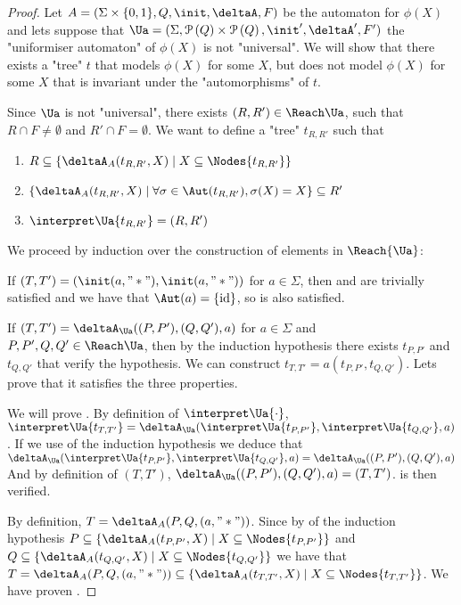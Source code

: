\documentclass[a4paper,UKenglish,cleveref, autoref, thm-restate]{lipics-v2021}
\begin{document}
\begin{proof}
	Let $A =  (\Sigma \times \{0,1\}, Q, \init, \deltaA, F)$ be the automaton for $\phi(X)$ and lets suppose that
	$\Ua = (\Sigma, \parts Q \times \parts Q,\init', \deltaA', F')$ the "uniformiser automaton" of $\phi(X)$ is not "universal".
	We will show that there exists a "tree" $t$ that models  $\phi(X)$ for some $X$, but does not model $\phi(X)$ for
	some $X$ that is invariant under the "automorphisms" of $t$.

	Since $\Ua$ is not "universal", there exists $(R,R') \in \Reach \Ua$, such that $R \cap F \neq \emptyset$ and $R' \cap F = \emptyset$.
	We want to define a "tree" $t_{R,R'}$ such that
	\begin{enumerate}
		\item $R \subseteq \{ \deltaA_A (t_{R,R'},X) \mid X \subseteq \Nodes {t_{R,R'}}\}$ \label{lem:prop1}
		\item $\{ \deltaA_A (t_{R,R'},X) \mid \forall \sigma \in \Aut(t_{R,R'}), \sigma(X) = X\} \subseteq R'$\label{lem:prop2}
		\item $\interpret \Ua {t_{R,R'}} = (R,R')$\label{lem:prop3}
	\end{enumerate}

	We proceed by induction over the construction of elements in $\Reach {\Ua}$:

	If $(T,T') = (\init(a,"*"), \init (a, "*"))$ for $a \in \Sigma$, then  and  are trivially satisfied and we have that
	$\Aut (a) = \{\text{id}\}$, so  is also satisfied.

	If $(T,T') = \deltaA_{\Ua}((P,P'),(Q,Q'),a)$ for $a \in \Sigma$ and $P,P',Q,Q' \in \Reach \Ua$, then by the induction hypothesis there exists
	$t_{P,P'}$ and $t_{Q,Q'}$ that verify the hypothesis. We can construct $t_{T,T'} = a(t_{P,P'},t_{Q,Q'})$. Lets prove that it satisfies the
	three properties.

	We will prove .
	By definition of $\interpret \Ua {\cdot}$,
	$\interpret \Ua {t_{T,T'}} = \deltaA_{\Ua} (\interpret \Ua {t_{P,P'}}, \interpret \Ua {t_{Q,Q'}}, a)$.
	If we use  of the induction hypothesis we deduce that
	$\deltaA_{\Ua} (\interpret \Ua {t_{P,P'}}, \interpret \Ua {t_{Q,Q'}}, a) = \deltaA_{\Ua} ((P,P'), (Q,Q'), a)$
	And by definition of $(T,T')$, $\deltaA_{\Ua} ((P,P'), (Q,Q'), a) = (T,T')$.
	 is then verified.

	By definition, $T = \deltaA_A(P,Q,(a,"*"))$. Since by  of the induction hypothesis $P \subseteq \{ \deltaA_A (t_{P,P'},X) \mid X \subseteq \Nodes {t_{P,P'}}\}$
	and $Q \subseteq \{ \deltaA_A (t_{Q,Q'},X) \mid X \subseteq \Nodes {t_{Q,Q'}}\}$  we have that
	$T = \deltaA_A(P,Q,(a,"*")) \subseteq \{ \deltaA_A (t_{T,T'},X) \mid X \subseteq \Nodes {t_{T,T'}}\}$. We have proven .


\end{proof}
\end{document}
